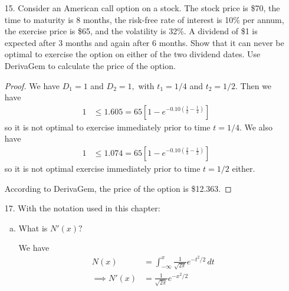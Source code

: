 \documentclass{article}
\begin{document}
\begin{itemize}
	\item[15.] Consider an American call option on a stock. The stock price is \$70, the time to maturity is 8 months, the risk-free rate of interest is 10\% per annum, the exercise price is \$65, and the volatility is 32\%. A dividend of \$1 is expected after 3 months and again after 6 months. Show that it can never be optimal to exercise the option on either of the two dividend dates. Use DerivaGem to calculate the price of the option.
		\begin{proof}
			We have $D_1 = 1$ and $D_2=1,$ with $t_1=1/4$ and $t_2=1/2.$ Then we have
			\begin{align*}
				1 &\le 1.605 = 65\left[ 1-e^{-0.10\left(\frac{1}{2}-\frac{1}{4}\right)} \right] 
			\end{align*}
			so it is not optimal to exercise immediately prior to time $t=1/4.$ We also have
			\begin{align*}
				1 &\le 1.074 = 65\left[ 1-e^{-0.10\left( \frac{2}{3}-\frac{1}{2} \right)} \right]
			\end{align*}
			so it is not optimal exercise immediately prior to time $t=1/2$ either.

			According to DerivaGem, the price of the option is \$12.363.
		\end{proof}

	\item[17.] With the notation used in this chapter:
		\begin{enumerate}[(a)]
			\item What is $N'(x)?$
				\begin{soln}
					We have
					\begin{align*}
						N(x) &= \int_{-\infty}^x \frac{1}{\sqrt{2\pi}}e^{-t^2/2}\, dt \\
						\implies N'(x) &= \frac{1}{\sqrt{2\pi}}e^{-x^2/2}
					\end{align*}
				\end{soln}


\end{enumerate}
\end{itemize}
\end{document}
